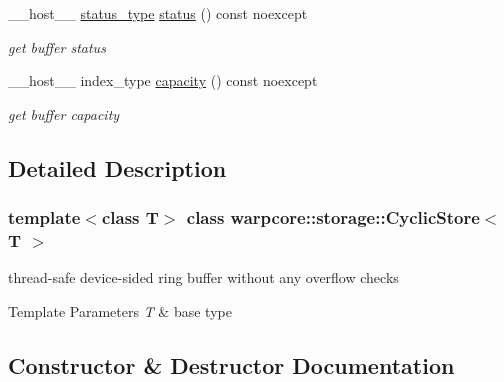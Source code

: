 \begin{DoxyCompactItemize}
\+\_\+\+\_\+host\+\_\+\+\_\+ \hyperlink{classwarpcore_1_1Status}{status\+\_\+type} \hyperlink{classwarpcore_1_1storage_1_1CyclicStore_ab6c224b2b5a49d93dc7e052ec7b8cc32}{status} () const noexcept
\begin{DoxyCompactList}\small\item\em get buffer status \end{DoxyCompactList}\item 
\+\_\+\+\_\+host\+\_\+\+\_\+ index\+\_\+type \hyperlink{classwarpcore_1_1storage_1_1CyclicStore_acc4bfbb9b10868a193301d0ec5a46711}{capacity} () const noexcept
\begin{DoxyCompactList}\small\item\em get buffer capacity \end{DoxyCompactList}\end{DoxyCompactItemize}


\subsection{Detailed Description}
\subsubsection*{template$<$class T$>$\newline
class warpcore\+::storage\+::\+Cyclic\+Store$<$ T $>$}

thread-\/safe device-\/sided ring buffer without any overflow checks 


\begin{DoxyTemplParams}{Template Parameters}
{\em T} & base type \\
\hline
\end{DoxyTemplParams}


\subsection{Constructor \& Destructor Documentation}
\mbox{\label{classwarpcore_1_1storage_1_1CyclicStore_a90547b0e8e7f2d2bf4ca54ecbebeff6c}} 
